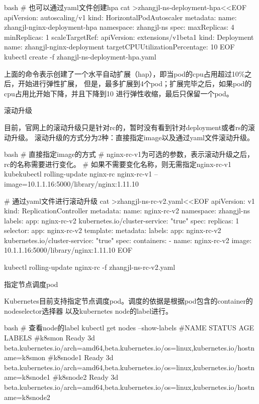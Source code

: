 \begin{outline}[enumerate]
\begin{code-in-enumerate}{bash}
# 也可以通过yaml文件创建hpa
cat >zhangjl-ns-deployment-hpa<<EOF
apiVersion: autoscaling/v1
kind: HorizontalPodAutoscaler
metadata:
  name: zhangjl-nginx-deployment-hpa
  namespace: zhangjl-ns
spec:
  maxReplicas: 4
  minReplicas: 1
  scaleTargetRef:
    apiVersion: extensions/v1beta1
    kind: Deployment
    name: zhangjl-nginx-deployment
  targetCPUUtilizationPercentage: 10
EOF
kubectl create -f zhangjl-ns-deployment-hpa.yaml

\end{code-in-enumerate}
上面的命令表示创建了一个水平自动扩展（hap），即当pod的cpu占用超过10\%之后，开始进行弹性扩展，
但是，最多扩展到4个pod；扩展完毕之后，如果pod的cpu占用比开始下降，并且下降到10%
进行弹性收缩，最后只保留一个pod。

\1 滚动升级

目前，官网上的滚动升级只是针对rc的，暂时没有看到针对deployment或者rs的滚动升级。
滚动升级的方式分为2种：直接指定image以及通过yaml文件滚动升级。
\begin{code-in-enumerate}{bash}
# 直接指定image的方式
# nginx-rc-v1为可选的参数，表示滚动升级之后，rc的名称需要进行变化。
# 如果不需要变化名称，则无需指定nginx-rc-v1
kubekubectl rolling-update nginx-rc nginx-rc-v1 --image=10.1.1.16:5000/library/nginx:1.11.10

# 通过yaml文件进行滚动升级
cat >zhangjl-ns-rc-v2.yaml<<EOF
apiVersion: v1
kind: ReplicationController
metadata:
  name: nginx-rc-v2
  namespace: zhangjl-ns
  labels:
    app: nginx-rc-v2
    kubernetes.io/cluster-service: "true"
spec:
  replicas: 1
  selector:
    app: nginx-rc-v2
  template:
    metadata:
      labels:
        app: nginx-rc-v2
        kubernetes.io/cluster-service: "true"
    spec:
      containers:
      - name: nginx-rc-v2
        image: 10.1.1.16:5000/library/nginx:1.11.10
EOF

kubectl rolling-update nginx-rc -f zhangjl-ns-rc-v2.yaml
\end{code-in-enumerate}

\1 指定节点调度pod

Kubernetes目前支持指定节点调度pod。调度的依据是根据pod包含的container的nodeselector选择器
以及kubernetes node的label进行。
\begin{code-in-enumerate}{bash}
# 查看node的label
kubectl get nodes --show-labels
#NAME       STATUS    AGE       LABELS
#k8smon     Ready     3d        beta.kubernetes.io/arch=amd64,beta.kubernetes.io/os=linux,kubernetes.io/hostname=k8smon
#k8snode1   Ready     3d        beta.kubernetes.io/arch=amd64,beta.kubernetes.io/os=linux,kubernetes.io/hostname=k8snode1
#k8snode2   Ready     3d        beta.kubernetes.io/arch=amd64,beta.kubernetes.io/os=linux,kubernetes.io/hostname=k8snode2


\end{code-in-enumerate}
\end{outline}
